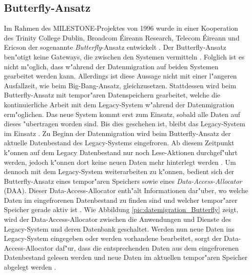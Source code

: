 
\subsection{Butterfly-Ansatz}


Im Rahmen des MILESTONE-Projektes von 1996 wurde in einer Kooperation des Trinity College Dublin, Broadcom \'{E}ireann Research, Telecom \'{E}ireann und Ericson der sogenannte \textit{Butterfly}-Ansatz entwickelt \citep[S.~202]{wuLawlessBisbal-1997}. Der Butterfly-Ansatz ben"otigt keine Gateways, die zwischen den Systemen vermitteln \citep[S.~202]{wuLawlessBisbal-1997}. Folglich ist es nicht m"oglich, dass w"ahrend der Datenmigration auf beiden Systemen gearbeitet werden kann. Allerdings ist diese Aussage nicht mit einer l"angeren Ausfallzeit, wie beim Big-Bang-Ansatz, gleichzusetzen. Stattdessen wird beim Butterfly-Ansatz mit tempor"aren Datenspeichern gearbeitet, welche die kontinuierliche Arbeit mit dem Legacy-System w"ahrend der Datenmigration erm"oglichen. Das neue System kommt erst zum Einsatz, sobald alle Daten auf dieses "ubertragen worden sind. Bis dies geschehen ist, bleibt das Legacy-System im Einsatz \citep[S.~3]{wuLawless-1997}.
\lb
Zu Beginn der Datenmigration wird beim Butterfly-Ansatz der aktuelle Datenbestand des Legacy-Systems eingefroren. Ab diesem Zeitpunkt k"onnen auf dem Legacy Datenbestand nur noch Lese-Aktionen durchgef"uhrt werden, jedoch k"onnen dort keine neuen Daten mehr hinterlegt werden \citep[S.~202]{wuLawlessBisbal-1997}. Um dennoch mit dem Legacy-System weiterarbeiten zu k"onnen, bedient sich der Butterfly-Ansatz eines tempor"aren Speichers sowie eines \textit{Data-Access-Allocator} (DAA). Dieser Data-Access-Allocator enth"alt Informationen dar"uber, wo welche Daten im eingefrorenen Datenbestand zu finden sind und welcher tempor"arer Speicher gerade aktiv ist \citep[S.~202]{wuLawlessBisbal-1997}. Wie Abbildung \ref{pic:datemigration_Butterfly} zeigt, wird der Data-Access-Allocator zwischen die Anwendungen und Dienste des Legacy-System und deren Datenbank geschaltet. Werden nun neue Daten ins Legacy-System eingegeben oder werden vorhandene bearbeitet, sorgt der Data-Access-Allocator daf"ur, dass die entsprechenden Daten aus dem eingefrorenen Datenbestand gelesen werden und neue Daten im aktuellen tempor"aren Speicher abgelegt werden \citep[S.~202]{wuLawlessBisbal-1997}.
\lb

